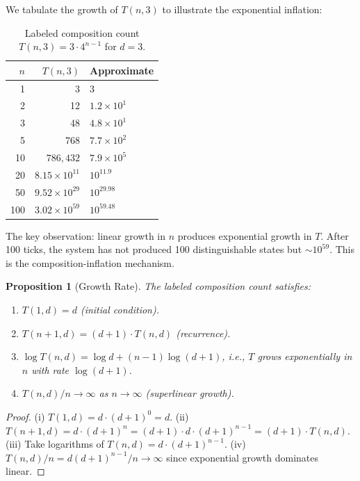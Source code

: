 \documentclass[twocolumn,10pt,a4paper]{article}
\newtheorem{proposition}[theorem]{Proposition}
\theoremstyle{definition}
\theoremstyle{remark}
\begin{document}
We tabulate the growth of $T(n,3)$ to illustrate the exponential inflation:

\begin{table}[h]
\centering
\caption{Labeled composition count $T(n,3) = 3 \cdot 4^{n-1}$ for $d = 3$.}
\label{tab:growth}
\begin{tabular}{@{}rrl@{}}
\toprule
$n$ & $T(n,3)$ & Approximate \\
\midrule
1   & 3                          & $3$ \\
2   & 12                         & $1.2 \times 10^1$ \\
3   & 48                         & $4.8 \times 10^1$ \\
5   & 768                        & $7.7 \times 10^2$ \\
10  & $786{,}432$                & $7.9 \times 10^5$ \\
20  & $8.15 \times 10^{11}$      & $10^{11.9}$ \\
50  & $9.52 \times 10^{29}$      & $10^{29.98}$ \\
100 & $3.02 \times 10^{59}$      & $10^{59.48}$ \\
\bottomrule
\end{tabular}
\end{table}

The key observation: linear growth in $n$ produces exponential growth in $T$. After 100 ticks, the system has not produced 100 distinguishable states but $\sim 10^{59}$. This is the composition-inflation mechanism.

\begin{proposition}[Growth Rate]
\label{prop:growth}
The labeled composition count satisfies:
\begin{enumerate}[label=(\roman*)]
\item $T(1,d) = d$ (initial condition).
\item $T(n+1,d) = (d+1) \cdot T(n,d)$ (recurrence).
\item $\log T(n,d) = \log d + (n-1)\log(d+1)$, i.e., $T$ grows exponentially in $n$ with rate $\log(d+1)$.
\item $T(n,d) / n \to \infty$ as $n \to \infty$ (superlinear growth).
\end{enumerate}
\end{proposition}

\begin{proof}
(i) $T(1,d) = d \cdot (d+1)^0 = d$. (ii) $T(n+1,d) = d \cdot (d+1)^n = (d+1) \cdot d \cdot (d+1)^{n-1} = (d+1) \cdot T(n,d)$. (iii) Take logarithms of $T(n,d) = d \cdot (d+1)^{n-1}$. (iv) $T(n,d)/n = d(d+1)^{n-1}/n \to \infty$ since exponential growth dominates linear.
\end{proof}
\end{document}
